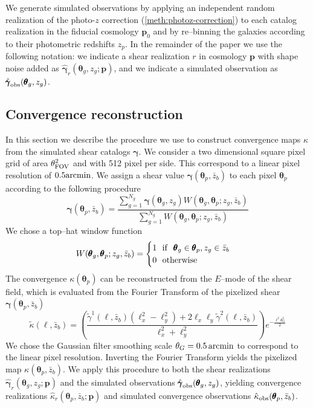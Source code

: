 \documentclass[reprint,aps,prd,superscriptaddress,showkeys,showpacs]{revtex4-1}
\newcommand{\bb}[1]{\mathbf{#1}}
\newcommand{\h}[1]{\hat{#1}}
\begin{document}
We generate simulated observations by applying an independent random realization of the photo-$z$ correction (\ref{meth:photoz-correction}) to each catalog realization in the fiducial cosmology $\bb{p}_0$ and by re--binning the galaxies according to their photometric redshifts $z_p$. In the remainder of the paper we use the following notation: we indicate a shear realization $r$ in cosmology $\bb{p}$ with shape noise added as $\h{\pmb{\gamma}}_r(\pmb{\theta}_g,z_g;\bb{p})$, and we indicate a simulated observation as $\h{\pmb{\gamma}}_{\rm obs}(\pmb{\theta}_g,z_g)$.           


\subsection{Convergence reconstruction}
In this section we describe the procedure we use to construct convergence maps $\kappa$ from the simulated shear catalogs $\pmb{\gamma}$. We consider a two dimensional square pixel grid of area $\theta_{\rm FOV}^2$ and with 512 pixel per side. This correspond to a linear pixel resolution of $0.5 \rm{arcmin}$. We assign a shear value $\pmb{\gamma}(\pmb{\theta}_p,\bar{z}_b)$ to each pixel $\pmb{\theta}_p$ according to the following procedure
\begin{equation}
\pmb{\gamma}(\pmb{\theta}_p,\bar{z}_b) = \frac{\sum_{g=1}^{N_g}\pmb{\gamma}(\pmb{\theta}_g,z_g)W(\pmb{\theta}_g,\pmb{\theta}_p;z_g,\bar{z}_b)}{\sum_{g=1}^{N_g}W(\pmb{\theta}_g,\pmb{\theta}_p;z_g,\bar{z}_b)}
\end{equation}   
%
We chose a top--hat window function
\begin{equation}
W(\pmb{\theta}_g,\pmb{\theta}_p;z_g,\bar{z}_b) = 
\begin{cases}
1 \,\,\,\,{\rm if}\,\,\,\, \pmb{\theta}_g\in\pmb{\theta}_p,z_g\in\bar{z}_b \\
0 \,\,\,\,{\rm otherwise}
\end{cases}
\end{equation} 
%
The convergence $\kappa(\pmb{\theta}_p)$ can be reconstructed from the $E$--mode of the shear field, which is evaluated from the Fourier Transform of the pixelized shear $\pmb{\gamma}(\pmb{\theta}_p,\bar{z}_b)$
\begin{equation}
\label{meth:psdefinition}
\tilde\kappa(\pmb{\ell},\bar{z}_b) = \left(\frac{\tilde{\gamma}^1(\pmb{\ell},\bar{z}_b)(\ell_x^2-\ell_y^2)+2\ell_x\ell_y\tilde{\gamma}^2(\pmb{\ell},\bar{z}_b)}{\ell_x^2+\ell_y^2}\right) e^{-\frac{\ell^2\theta_G^2}{2}}
\end{equation}
%
We chose the Gaussian filter smoothing scale $\theta_G=0.5\,{\rm arcmin}$ to correspond to the linear pixel resolution. Inverting the Fourier Transform yields the pixelized map $\kappa(\pmb{\theta}_p,\bar{z}_b)$. We apply this procedure to both the shear realizations $\h{\pmb{\gamma}}_r(\pmb{\theta}_g,z_g;\bb{p})$ and the simulated observations $\h{\pmb{\gamma}}_{\rm obs}(\pmb{\theta}_g,z_g)$, yielding convergence realizations $\h{\kappa}_r(\pmb{\theta}_p,\bar{z}_b;\bb{p})$ and simulated convergence observations $\h{\kappa}_{\rm obs}(\pmb{\theta}_p,\bar{z}_b)$. 
\end{document}
